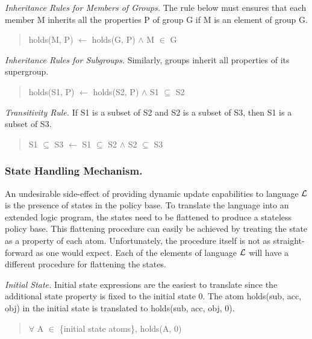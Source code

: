 \documentclass{llncs}
\begin{document}
        \emph{Inheritance Rules for Members of Groups.} The rule below must
        ensures that each member M inherits all the properties P of group G if
        M is an element of group G.

        \begin{quote}
          holds(M, P) $\leftarrow$ holds(G, P) $\land$ M $\in$ G
        \end{quote}

        \emph{Inheritance Rules for Subgroups.} Similarly, groups inherit all
        properties of its supergroup.

        \begin{quote}
          holds(S1, P) $\leftarrow$ holds(S2, P) $\land$ S1 $\subseteq$ S2
        \end{quote}

        \emph{Transitivity Rule.} If S1 is a subset of S2 and S2 is a subset
        of S3, then S1 is a subset of S3.

        \begin{quote}
          S1 $\subseteq$ S3 $\leftarrow$ S1 $\subseteq$ S2 $\land$ S2
          $\subseteq$ S3
        \end{quote}

      \subsubsection{State Handling Mechanism.}

        An undesirable side-effect of providing dynamic update capabilities to
        language $\cal{L}$ is the presence of states in the policy base. To
        translate the language into an extended logic program, the states need
        to be flattened to produce a stateless policy base. This flattening
        procedure can easily be achieved by treating the state as a property
        of each atom. Unfortunately, the procedure itself is not as straight-
        forward as one would expect. Each of the elements of language $\cal{L}$
        will have a different procedure for flattening the states.

        \emph{Initial State.} Initial state expressions are the easiest to
        translate since the additional state property is fixed to the initial
        state 0. The atom holds(sub, acc, obj) in the initial state is
        translated to holds(sub, acc, obj, 0).

        \begin{quote}
          $\forall$ A $\in$ \{initial state atoms\}, holds(A, 0)
        \end{quote}
\end{document}
